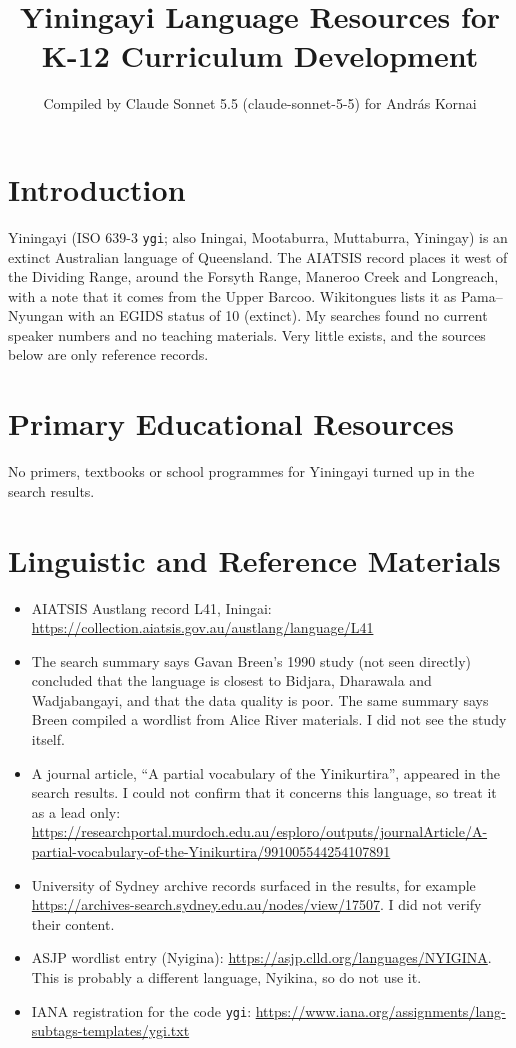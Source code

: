 \documentclass[12pt]{article}
\title{Yiningayi Language Resources for K-12 Curriculum Development}
\author{Compiled by Claude Sonnet 5.5 (claude-sonnet-5-5) for Andr\'as Kornai}
\date{}
\begin{document}
\maketitle

\section{Introduction}
Yiningayi (ISO 639-3 \texttt{ygi}; also Iningai, Mootaburra, Muttaburra, Yiningay) is an extinct Australian language of Queensland. The AIATSIS record places it west of the Dividing Range, around the Forsyth Range, Maneroo Creek and Longreach, with a note that it comes from the Upper Barcoo. Wikitongues lists it as Pama--Nyungan with an EGIDS status of 10 (extinct). My searches found no current speaker numbers and no teaching materials. Very little exists, and the sources below are only reference records.

\section{Primary Educational Resources}
No primers, textbooks or school programmes for Yiningayi turned up in the search results.

\section{Linguistic and Reference Materials}
\begin{itemize}
\item AIATSIS Austlang record L41, Iningai: \url{https://collection.aiatsis.gov.au/austlang/language/L41}
\item The search summary says Gavan Breen's 1990 study (not seen directly) concluded that the language is closest to Bidjara, Dharawala and Wadjabangayi, and that the data quality is poor. The same summary says Breen compiled a wordlist from Alice River materials. I did not see the study itself.
\item A journal article, ``A partial vocabulary of the Yinikurtira'', appeared in the search results. I could not confirm that it concerns this language, so treat it as a lead only: \url{https://researchportal.murdoch.edu.au/esploro/outputs/journalArticle/A-partial-vocabulary-of-the-Yinikurtira/991005544254107891}
\item University of Sydney archive records surfaced in the results, for example \url{https://archives-search.sydney.edu.au/nodes/view/17507}. I did not verify their content.
\item ASJP wordlist entry (Nyigina): \url{https://asjp.clld.org/languages/NYIGINA}. This is probably a different language, Nyikina, so do not use it.
\item IANA registration for the code \texttt{ygi}: \url{https://www.iana.org/assignments/lang-subtags-templates/ygi.txt}
\end{itemize}
\end{document}
